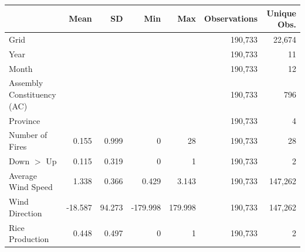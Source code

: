 \begin{tabular}{lrrrrrr}
\toprule
 & Mean & SD & Min & Max & Observations & Unique Obs.\\
\midrule
Grid &  &  &  &  & 190,733 & 22,674\\
Year &  &  &  &  & 190,733 & 11\\
Month &  &  &  &  & 190,733 & 12\\
Assembly Constituency (AC) &  &  &  &  & 190,733 & 796\\
Province &  &  &  &  & 190,733 & 4\\
Number of Fires & 0.155 & 0.999 & 0 & 28 & 190,733 & 28\\
Down $>$ Up & 0.115 & 0.319 & 0 & 1 & 190,733 & 2\\
Average Wind Speed & 1.338 & 0.366 & 0.429 & 3.143 & 190,733 & 147,262\\
Wind Direction & -18.587 & 94.273 & -179.998 & 179.998 & 190,733 & 147,262\\
Rice Production & 0.448 & 0.497 & 0 & 1 & 190,733 & 2\\
\bottomrule
\end{tabular}
